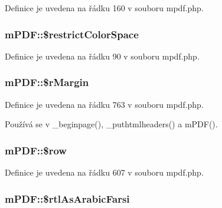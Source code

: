 Definice je uvedena na řádku 160 v souboru mpdf.\-php.

\hypertarget{classm_p_d_f_a751b9bd1b55f98ed955101a8d3879953}{
\subsubsection[{\$restrict\-Color\-Space}]{\setlength{\rightskip}{0pt plus 5cm}m\-P\-D\-F\-::\$restrict\-Color\-Space}}\label{classm_p_d_f_a751b9bd1b55f98ed955101a8d3879953}


Definice je uvedena na řádku 90 v souboru mpdf.\-php.

\hypertarget{classm_p_d_f_ad1dbc4ac9154e9d11a9178a5d539d288}{
\subsubsection[{\$r\-Margin}]{\setlength{\rightskip}{0pt plus 5cm}m\-P\-D\-F\-::\$r\-Margin}}\label{classm_p_d_f_ad1dbc4ac9154e9d11a9178a5d539d288}


Definice je uvedena na řádku 763 v souboru mpdf.\-php.



Používá se v \-\_\-beginpage(), \-\_\-puthtmlheaders() a m\-P\-D\-F().

\hypertarget{classm_p_d_f_ae8bcaa5b49ed3e996082741565bb15df}{
\subsubsection[{\$row}]{\setlength{\rightskip}{0pt plus 5cm}m\-P\-D\-F\-::\$row}}\label{classm_p_d_f_ae8bcaa5b49ed3e996082741565bb15df}


Definice je uvedena na řádku 607 v souboru mpdf.\-php.

\hypertarget{classm_p_d_f_a55a8a2ed6cb3882f3d81bfcb2a280af0}{
\subsubsection[{\$rtl\-As\-Arabic\-Farsi}]{\setlength{\rightskip}{0pt plus 5cm}m\-P\-D\-F\-::\$rtl\-As\-Arabic\-Farsi}}\label{classm_p_d_f_a55a8a2ed6cb3882f3d81bfcb2a280af0}


